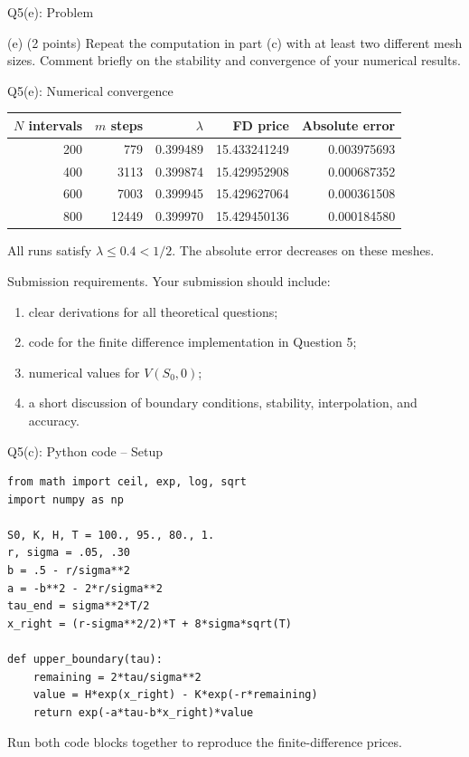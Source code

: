 \documentclass{beamer}
\newcommand{\keytext}[1]{\textcolor{lecturekey}{\textbf{#1}}}
\begin{document}
\begin{frame}{Q5(e): Problem}
\footnotesize
\setlength{\abovedisplayskip}{5pt}
\setlength{\belowdisplayskip}{5pt}
\begin{block}{(e) \hfill (2 points)}
Repeat the computation in part (c) with at least two different mesh sizes.
Comment briefly on the stability and convergence of your numerical results.
\end{block}
\end{frame}

\begin{frame}{Q5(e): Numerical convergence}
\small
\begin{center}
\begin{tabular}{rrrrr}
\toprule
$N$ intervals & $m$ steps & $\lambda$ & FD price & Absolute error\\\midrule
200&779&0.399489&15.433241249&0.003975693\\
400&3113&0.399874&15.429952908&0.000687352\\
600&7003&0.399945&15.429627064&0.000361508\\
800&12449&0.399970&15.429450136&0.000184580\\\bottomrule
\end{tabular}
\end{center}
All runs satisfy \keytext{$\lambda\leq0.4<1/2$}. The absolute error decreases on these meshes.
\end{frame}

\begin{frame}{Submission requirements.}
\footnotesize
\setlength{\abovedisplayskip}{5pt}
\setlength{\belowdisplayskip}{5pt}
Your submission should include:
\begin{enumerate}
\item clear derivations for all theoretical questions;
\item code for the finite difference implementation in Question 5;
\item numerical values for $V(S_0,0)$;
\item a short discussion of boundary conditions, stability, interpolation, and accuracy.
\end{enumerate}
\end{frame}

\appendix

\begin{frame}[fragile]{Q5(c): Python code -- Setup}
\begin{lstlisting}
from math import ceil, exp, log, sqrt
import numpy as np

S0, K, H, T = 100., 95., 80., 1.
r, sigma = .05, .30
b = .5 - r/sigma**2
a = -b**2 - 2*r/sigma**2
tau_end = sigma**2*T/2
x_right = (r-sigma**2/2)*T + 8*sigma*sqrt(T)

def upper_boundary(tau):
    remaining = 2*tau/sigma**2
    value = H*exp(x_right) - K*exp(-r*remaining)
    return exp(-a*tau-b*x_right)*value
\end{lstlisting}
Run both code blocks together to reproduce the finite-difference prices.
\end{frame}
\end{document}
